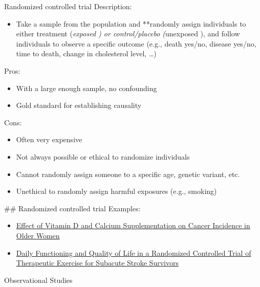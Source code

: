 \documentclass[
  ignorenonframetext,
]{beamer}
\providecommand{\tightlist}{%
  \setlength{\itemsep}{0pt}\setlength{\parskip}{0pt}}
\begin{document}
\begin{frame}{Randomized controlled trial}
\protect\hypertarget{randomized-controlled-trial-2}{}
Description:

\begin{itemize}
\tightlist
\item
  Take a sample from the population and **randomly assign individuals to
  either treatment (\emph{exposed ) or control/placebo (}unexposed ),
  and follow individuals to observe a specific outcome (e.g., death
  yes/no, disease yes/no, time to death, change in cholesterol level,
  \ldots)
\end{itemize}

Pros:

\begin{itemize}
\tightlist
\item
  With a large enough sample, no confounding
\item
  Gold standard for establishing causality
\end{itemize}

Cons:

\begin{itemize}
\item
  Often very expensive
\item
  Not always possible or ethical to randomize individuals
\item
  Cannot randomly assign someone to a specific age, genetic variant,
  etc.
\item
  Unethical to randomly assign harmful exposures (e.g., smoking)
\end{itemize}

\#\# Randomized controlled trial Examples:

\begin{itemize}
\tightlist
\item
  \href{https://jamanetwork.com/journals/jama/article-abstract/2613159}{Effect
  of Vitamin D and Calcium Supplementation on Cancer Incidence in Older
  Women}
\item
  \href{http://stroke.ahajournals.org/content/36/8/1764.short}{Daily
  Functioning and Quality of Life in a Randomized Controlled Trial of
  Therapeutic Exercise for Subacute Stroke Survivors}
\end{itemize}
\end{frame}

\begin{frame}{}
\protect\hypertarget{section-1}{}
Observational Studies
\end{frame}
\end{document}
